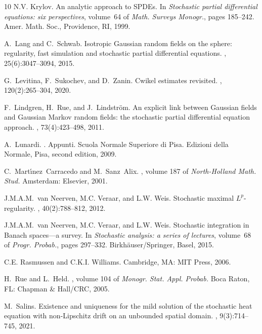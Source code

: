 \documentclass[reqno]{amsart}
\theoremstyle{plain}
\theoremstyle{remark}
\theoremstyle{plain}
\numberwithin{equation}{section}
\newcommand{\1}{\one}
\begin{document}
\begin{thebibliography}{10}
N.V. Krylov.
\newblock An analytic approach to {SPDE}s.
\newblock In {\em Stochastic partial differential equations: six perspectives},
  volume~64 of {\em Math. Surveys Monogr.}, pages 185--242. Amer. Math. Soc.,
  Providence, RI, 1999.

A.~Lang and C.~Schwab.
\newblock Isotropic {Gaussian} random fields on the sphere: regularity, fast
  simulation and stochastic partial differential equations.
, 25(6):3047--3094, 2015.

G.~Levitina, F.~Sukochev, and D.~Zanin.
\newblock Cwikel estimates revisited.
, 120(2):265--304, 2020.

F.~Lindgren, H.~Rue, and J.~Lindstr{\"o}m.
\newblock An explicit link between {Gaussian} fields and {Gaussian} {Markov}
  random fields: the stochastic partial differential equation approach.
, 73(4):423--498,
  2011.

A.~Lunardi.
.
\newblock Appunti. Scuola Normale Superiore di Pisa. Edizioni della Normale,
  Pisa, second edition, 2009.

C.~Mart{\'{\i}}nez~Carracedo and M.~Sanz~Alix.
, volume 187 of
  {\em North-Holland Math. Stud.}
\newblock Amsterdam: Elsevier, 2001.

J.M.A.M.~van Neerven, M.C. Veraar, and L.W. Weis.
\newblock Stochastic maximal {$L^p$}-regularity.
, 40(2):788--812, 2012.

J.M.A.M.~van Neerven, M.C. Veraar, and L.W. Weis.
\newblock Stochastic integration in {B}anach spaces---a survey.
\newblock In {\em Stochastic analysis: a series of lectures}, volume~68 of {\em
  Progr. Probab.}, pages 297--332. Birkh\"{a}user/Springer, Basel, 2015.

C.E. Rasmussen and C.K.I. Williams.
\newblock Cambridge, MA: MIT Press, 2006.

H.~Rue and L.~Held.
,
  volume 104 of {\em Monogr. Stat. Appl. Probab.}
\newblock Boca Raton, FL: Chapman \& Hall/CRC, 2005.

M.~Salins.
\newblock Existence and uniqueness for the mild solution of the stochastic heat
  equation with non-{Lipschitz} drift on an unbounded spatial domain.
, 9(3):714--745,
  2021.


\end{thebibliography}
\end{document}
